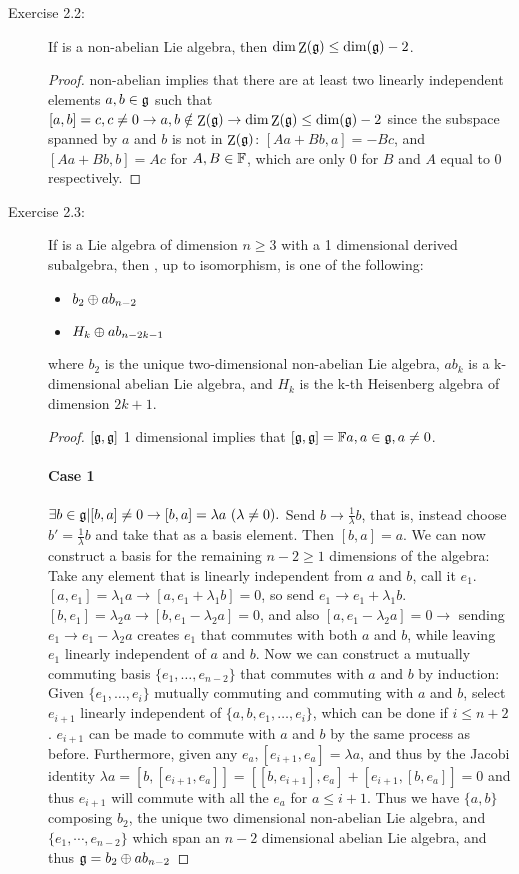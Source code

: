 \documentclass[aps,onecolumn,secnumarabic,nobalancelastpage,amsmath,amssymb]{revtex4}
\DeclareMathOperator{\Center}{Z}
\begin{document}
\begin{description}
\item[Exercise 2.2:] If {\g} is a non-abelian Lie algebra, then $\dim \Center(\g) \le \dim(\g) - 2$.
\begin{proof}
{\g} non-abelian implies that there are at least two linearly independent elements $a,b \in \mathord{\mathfrak{g}}$ such that $[a,b] = c, c \ne 0 \rightarrow a,b \notin \Center(\g) \rightarrow \dim \Center(\g) \le \dim(\g) - 2$ since the subspace spanned by $a$ and $b$ is not in $\Center(\g)$: $[Aa + Bb,a] = -Bc$, and $[Aa + Bb,b] = Ac$ for $A,B \in \mathbb{F}$, which are only 0 for $B$ and $A$ equal to 0 respectively. 
\end{proof}

\item[Exercise 2.3:] If {\g} is a Lie algebra of dimension $n \ge 3$ with a 1 dimensional derived subalgebra, then {\g}, up to isomorphism, is one of the following:
\begin{itemize}
\item $b_2 \oplus ab_{n - 2}$
\item $H_k \oplus ab_{n - 2k - 1}$
\end{itemize}
where $b_2$ is the unique two-dimensional non-abelian Lie algebra, $ab_{k}$ is a k-dimensional abelian Lie algebra, and $H_k$ is the k-th Heisenberg algebra of dimension $2k + 1$. 
\begin{proof}
$[\mathord{\mathfrak{g}},\mathord{\mathfrak{g}}]$ 1 dimensional implies that $[\mathord{\mathfrak{g}},\mathord{\mathfrak{g}}] = \mathbb{F} a, a \in \mathord{\mathfrak{g}}, a \ne 0$. 

\paragraph*{Case 1} $\exists b \in \mathord{\mathfrak{g}} | [b,a] \ne 0 \rightarrow [b,a] = \lambda a\text{ }(\lambda \ne 0).$ Send $b \rightarrow \frac{1}{\lambda}b$, that is, instead choose $b' = \frac{1}{\lambda}b$ and take that as a basis element. Then $[b,a] = a$.  We can now construct a basis for the remaining $n-2 \ge 1$ dimensions of the algebra: Take any element that is linearly independent from $a$ and $b$, call it $e_1$. $[a,e_1] = \lambda_1 a \rightarrow [a, e_1+\lambda_1 b] = 0$, so send $e_1 \rightarrow e_1 + \lambda_1 b$.  $[b, e_1] = \lambda_2 a \rightarrow [b, e_1 - \lambda_2 a] = 0$, and also $[a, e_1 - \lambda_2 a] = 0 \rightarrow$ sending $e_1 \rightarrow e_1 - \lambda_2 a$ creates $e_1$ that commutes with both $a$ and $b$, while leaving $e_1$ linearly independent of $a$ and $b$.  Now we can construct a mutually commuting basis $\{e_1,\ldots,e_{n-2}\}$ that commutes with $a$ and $b$ by induction:  Given $\{e_1,\ldots,e_i\}$ mutually commuting and commuting with $a$ and $b$, select $e_{i+1}$ linearly independent of $\{a,b,e_1,\ldots,e_i\}$, which can be done if $i \le n+2$. $e_{i+1}$ can be made to commute with $a$ and $b$ by the same process as before.  Furthermore, given any $e_a, [e_{i+1},e_a] = \lambda a$, and thus by the Jacobi identity $\lambda a = [b,[e_{i+1},e_a]] = [[b,e_{i+1}],e_a] + [e_{i+1},[b,e_a]] = 0$ and thus $e_{i+1}$ will commute with all the $e_a$ for $a \le i+1$.  Thus we have $\{a,b\}$ composing $b_2$, the unique two dimensional non-abelian Lie algebra, and $\{e_1,\cdots,e_{n-2}\}$ which span an $n-2$ dimensional abelian Lie algebra, and thus $\mathord{\mathfrak{g}} = b_2 \oplus ab_{n-2}$ 

\end{proof}
\end{description}
\end{document}
